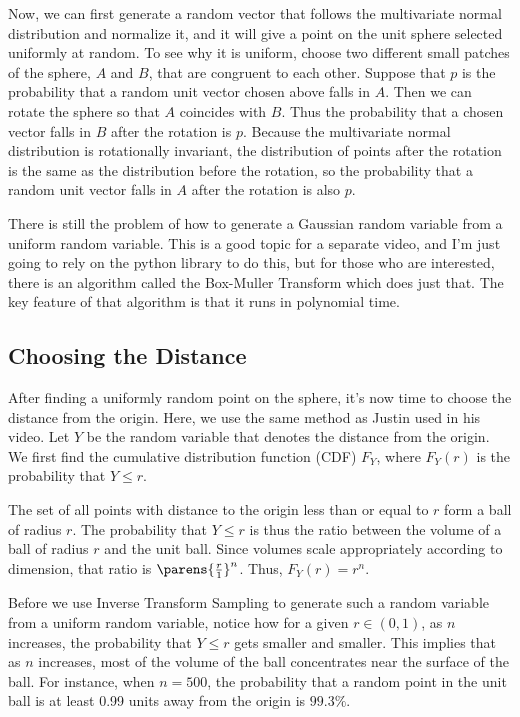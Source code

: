 \documentclass{article}
\begin{document}

Now, we can first generate a random vector that follows the multivariate normal distribution and normalize it, and it will give a point on the unit sphere selected uniformly at random. To see why it is uniform, choose two different small patches of the sphere, $A$ and $B$, that are congruent to each other. Suppose that $p$ is the probability that a random unit vector chosen above falls in $A$. Then we can rotate the sphere so that $A$ coincides with $B$. Thus the probability that a chosen vector falls in $B$ after the rotation is $p$. Because the multivariate normal distribution is rotationally invariant, the distribution of points after the rotation is the same as the distribution before the rotation, so the probability that a random unit vector falls in $A$ after the rotation is also $p$.

There is still the problem of how to generate a Gaussian random variable from a uniform random variable. This is a good topic for a separate video, and I'm just going to rely on the python library to do this, but for those who are interested, there is an algorithm called the Box-Muller Transform which does just that. The key feature of that algorithm is that it runs in polynomial time.

\subsection{Choosing the Distance}

After finding a uniformly random point on the sphere, it's now time to choose the distance from the origin. Here, we use the same method as Justin used in his video. Let $Y$ be the random variable that denotes the distance from the origin. We first find the cumulative distribution function (CDF) $F_Y$, where $F_Y(r)$ is the probability that $Y \leq r$.

The set of all points with distance to the origin less than or equal to $r$ form a ball of radius $r$. The probability that $Y \leq r$ is thus the ratio between the volume of a ball of radius $r$ and the unit ball. Since volumes scale appropriately according to dimension, that ratio is $\parens{\frac{r}{1}}^n$. Thus, $F_Y(r) = r^n$.

Before we use Inverse Transform Sampling to generate such a random variable from a uniform random variable, notice how for a given $r \in (0, 1)$, as $n$ increases, the probability that $Y \leq r$ gets smaller and smaller. This implies that as $n$ increases, most of the volume of the ball concentrates near the surface of the ball. For instance, when $n = 500$, the probability that a random point in the unit ball is at least 0.99 units away from the origin is $99.3\%$.
\end{document}
